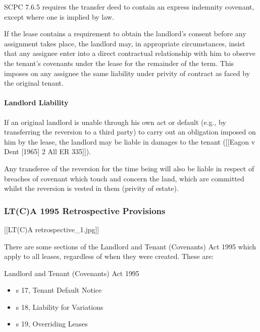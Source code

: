 \documentclass[
]{article}
\newenvironment{Shaded}{}{}
\newcommand{\NormalTok}[1]{#1}
\providecommand{\tightlist}{%
  \setlength{\itemsep}{0pt}\setlength{\parskip}{0pt}}
\begin{document}
SCPC 7.6.5 requires the transfer deed to contain an express indemnity
covenant, except where one is implied by law.

\begin{Shaded}
\begin{Highlighting}[]
\NormalTok{If the lease contains a requirement to obtain the landlord’s consent before any assignment takes place, the landlord may, in appropriate circumstances, insist that any assignee enter into a direct contractual relationship with him to observe the tenant’s covenants under the lease for the remainder of the term. This imposes on any assignee the same liability under privity of contract as faced by the original tenant. }
\end{Highlighting}
\end{Shaded}

\hypertarget{landlord-liability}{%
\paragraph{Landlord Liability}\label{landlord-liability}}

If an original landlord is unable through his own act or default (e.g.,
by transferring the reversion to a third party) to carry out an
obligation imposed on him by the lease, the landlord may be liable in
damages to the tenant ({[}{[}Eagon v Dent {[}1965{]} 2 All ER
335{]}{]}).

Any transferee of the reversion for the time being will also be liable
in respect of breaches of covenant which touch and concern the land,
which are committed whilst the reversion is vested in them (privity of
estate).

\hypertarget{ltca-1995-retrospective-provisions}{%
\subsubsection{LT(C)A 1995 Retrospective
Provisions}\label{ltca-1995-retrospective-provisions}}

{[}{[}LT(C)A retrospective\_1.jpg{]}{]}

There are some sections of the Landlord and Tenant (Covenants) Act 1995
which apply to all leases, regardless of when they were created. These
are:

Landlord and Tenant (Covenants) Act 1995

\begin{itemize}
\tightlist
\item
  s 17, Tenant Default Notice
\item
  s 18, Liability for Variations
\item
  s 19, Overriding Leases
\end{itemize}
\end{document}
